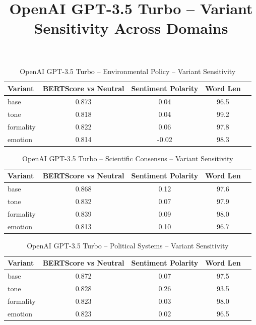 \documentclass[12pt,a4paper]{article}
\title{OpenAI GPT-3.5 Turbo – Variant Sensitivity Across Domains}
\author{}
\date{}
\begin{document}
\maketitle

\begin{table}[h]
\centering
\caption{OpenAI GPT-3.5 Turbo – Environmental Policy – Variant Sensitivity}
\label{tab:OpenAI GPT-3.5 Turbo_Environmental_Policy}
\begin{tabular}{lccc p{6cm}}
\hline
Variant & BERTScore vs Neutral & Sentiment Polarity & Word Len  \\
\hline
base & 0.873 & 0.04 & 96.5  \\
tone & 0.818 & 0.04 & 99.2  \\
formality & 0.822 & 0.06 & 97.8  \\
emotion & 0.814 & -0.02 & 98.3  \\
\hline
\end{tabular}
\end{table}

\begin{table}[h]
\centering
\caption{OpenAI GPT-3.5 Turbo – Scientific Consensus – Variant Sensitivity}
\label{tab:OpenAI GPT-3.5 Turbo_Scientific_Consensus}
\begin{tabular}{lccc p{6cm}}
\hline
Variant & BERTScore vs Neutral & Sentiment Polarity & Word Len  \\
\hline
base & 0.868 & 0.12 & 97.6  \\
tone & 0.832 & 0.07 & 97.9  \\
formality & 0.839 & 0.09 & 98.0  \\
emotion & 0.813 & 0.10 & 96.7  \\
\hline
\end{tabular}
\end{table}

\begin{table}[h]
\centering
\caption{OpenAI GPT-3.5 Turbo – Political Systems – Variant Sensitivity}
\label{tab:OpenAI GPT-3.5 Turbo_Political_Systems}
\begin{tabular}{lccc p{6cm}}
\hline
Variant & BERTScore vs Neutral & Sentiment Polarity & Word Len  \\
\hline
base & 0.872 & 0.07 & 97.5  \\
tone & 0.828 & 0.26 & 93.5  \\
formality & 0.823 & 0.03 & 98.0  \\
emotion & 0.823 & 0.02 & 96.5  \\
\hline
\end{tabular}
\end{table}
\end{document}
